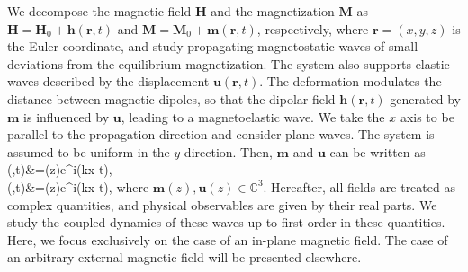 \documentclass[aps,prb,10pt,amsmath,amssymb,twocolumn,longbibliography,superscriptaddress]{revtex4-2}
\def\be#1\ee{\begin{align}#1\end{align}}
\begin{document}
We decompose the magnetic field $\bm{H}$ and the magnetization $\bm{M}$ as $\bm{H}=\bm{H}_0+\bm{h}(\bm{r},t)$ and $\bm{M}=\bm{M}_0+\bm{m}(\bm{r},t)$, respectively, where $\bm{r}=(x,y,z)$ is the Euler coordinate, and study propagating magnetostatic waves of small deviations from the equilibrium magnetization. The system also supports elastic waves described by the displacement $\bm{u}(\bm{r},t)$. The deformation modulates the distance between magnetic dipoles, so that the dipolar field $\bm{h}(\bm{r},t)$ generated by $\bm{m}$ is influenced by $\bm{u}$, leading to a magnetoelastic wave. We take the $x$ axis to be parallel to the propagation direction and consider plane waves. The system is assumed to be uniform in the $y$ direction. Then, $\bm{m}$ and $\bm{u}$ can be written as
\be
    \bm{m}(,t)&=(z)e^{i(kx-\omega t)},\\
    (,t)&=(z)e^{i(kx-\omega t)},\label{eq:Assumption}
\ee
where $\bm{m}(z),\bm{u}(z)\in\mathbb{C}^3$. Hereafter, all fields are treated as complex quantities, and physical observables are given by their real parts. We study the coupled dynamics of these waves up to first order in these quantities. Here, we focus exclusively on the case of an in-plane magnetic field. The case of an arbitrary external magnetic field will be presented elsewhere.
\end{document}

